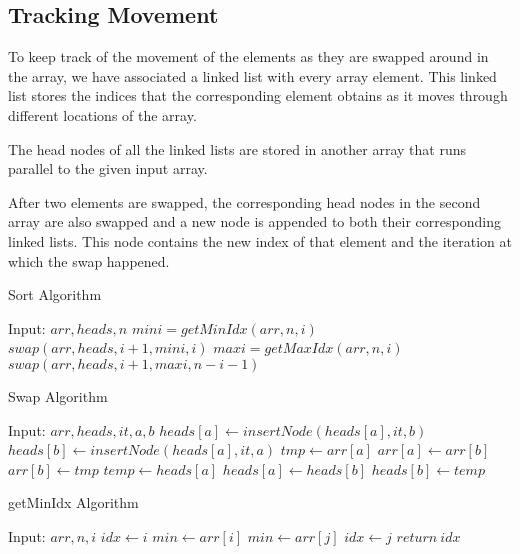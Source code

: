 \documentclass[letterpaper, 11 pt, conference]{ieeeconf}  %
\begin{document}
\subsection{Tracking Movement}
To keep track of the movement of the elements as they are swapped around in the array, we have associated a linked list with every array element. This linked list stores the indices that the corresponding element obtains as it moves through different locations of the array.

The head nodes of all the linked lists are stored in another array that runs parallel to the given input array.

After two elements are swapped, the corresponding head nodes in the second array are also swapped and a new node is appended to both their corresponding linked lists. This node contains the new index of that element and the iteration at which the swap happened.

\begin{algorithm}[H]
\caption{Sort Algorithm}\label{alg:sort}
\begin{algorithmic}
\State Input: $arr, heads, n$
	\State $mini = getMinIdx(arr, n, i)$
    	\State $swap(arr, heads, i+1, mini, i)$
    \EndIf
    \State $maxi = getMaxIdx(arr, n, i)$
    	\State $swap(arr, heads, i+1, maxi, n-i-1)$
    \EndIf
\EndFor
\end{algorithmic}
\end{algorithm}

\begin{algorithm}[H]
\caption{Swap Algorithm}\label{alg:swap}
\begin{algorithmic}
\State Input: $arr, heads, it, a, b$
\State $heads[a] \gets insertNode(heads[a], it, b)$
\State $heads[b] \gets insertNode(heads[a], it, a)$
\State $tmp \gets arr[a]$
\State $arr[a] \gets arr[b]$
\State $arr[b] \gets tmp$
\State $temp \gets heads[a]$
\State $heads[a] \gets heads[b]$
\State $heads[b] \gets temp$
\end{algorithmic}
\end{algorithm}

\begin{algorithm}[H]
\caption{getMinIdx Algorithm}\label{alg:getMin}
\begin{algorithmic}
\State Input: $arr, n, i$
\State $idx \gets i$
\State $min \gets arr[i]$
    	\State $min \gets arr[j]$
        \State $idx \gets j$
    \EndIf
\EndFor
\State $return~idx$
\end{algorithmic}
\end{algorithm}
\end{document}
